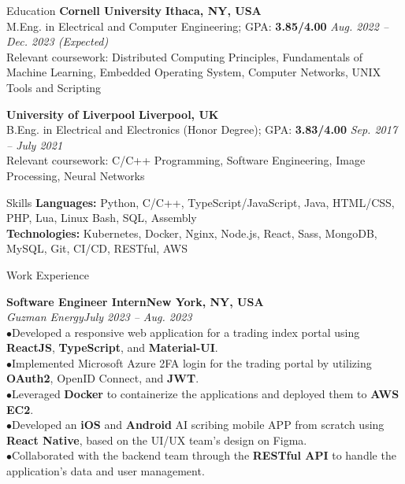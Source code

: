 \documentclass{resume} %
\begin{document}
\begin{rSection}{Education}
{\textbf{Cornell University}} \hfill{\textbf{Ithaca, NY, USA}}
\\ M.Eng. in Electrical and Computer Engineering; GPA: \textbf{3.85/4.00} \hfill{\em Aug. 2022 -- Dec. 2023 (Expected)}
\\ Relevant coursework: Distributed Computing Principles, Fundamentals of Machine Learning, Embedded Operating System, Computer Networks, UNIX Tools and Scripting

{\textbf{University of Liverpool}} \hfill{\textbf{Liverpool, UK}}
\\ B.Eng. in Electrical and Electronics (Honor Degree); GPA: \textbf{3.83/4.00} \hfill{\em Sep. 2017 -- July 2021}
\\ Relevant coursework: C/C++ Programming, Software Engineering, Image Processing, Neural Networks
\end{rSection}

\begin{rSection}{Skills}
{\textbf{Languages:}} Python, C/C++, TypeScript/JavaScript, Java, HTML/CSS, PHP, Lua, Linux Bash, SQL, Assembly
\\{\textbf{Technologies:}} Kubernetes, Docker, Nginx, Node.js, React, Sass, MongoDB, MySQL, Git, CI/CD, RESTful, AWS


\end{rSection}

\begin{rSection}{Work Experience}

{\bf Software Engineer Intern}\hfill{\textbf{New York, NY, USA}}
\\{\em Guzman Energy}\hfill {\em July 2023 -- Aug. 2023}
\\ $ \bullet $Developed a responsive web application for a trading index portal using \textbf{ReactJS}, \textbf{TypeScript}, and \textbf{Material-UI}.
\\ $ \bullet $Implemented Microsoft Azure 2FA login for the trading portal by utilizing \textbf{OAuth2}, OpenID Connect, and \textbf{JWT}.
\\ $ \bullet $Leveraged \textbf{Docker} to containerize the applications and deployed them to \textbf{AWS EC2}.
\\ $ \bullet $Developed an \textbf{iOS} and \textbf{Android} AI scribing mobile APP from scratch using \textbf{React Native}, based on the UI/UX team's design on Figma.
\\ $ \bullet $Collaborated with the backend team through the \textbf{RESTful API} to handle the application's data and user management.


\end{rSection}
\end{document}
